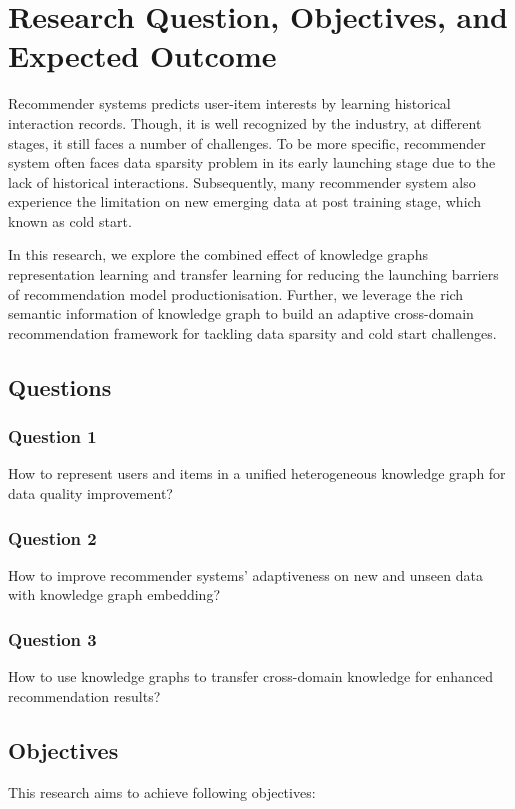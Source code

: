 
\section{Research Question, Objectives, and Expected Outcome}

Recommender systems predicts user-item interests by learning historical interaction records. Though, it is well recognized by the industry, at different stages, it still faces a number of challenges. 
To be more specific, recommender system often faces data sparsity problem in its early launching stage due to the lack of historical interactions. 
Subsequently, many recommender system also experience the limitation on new emerging data at post training stage, which known as cold start. 

In this research, we explore the combined effect of knowledge graphs representation learning and transfer learning for reducing the launching barriers of recommendation model productionisation. Further, we leverage the rich semantic information of knowledge graph to build an adaptive cross-domain recommendation framework for tackling data sparsity and cold start challenges. 

\subsection{Questions}

\subsubsection*{Question 1}
How to represent users and items in a unified heterogeneous knowledge graph for data quality improvement?

\subsubsection*{Question 2}
How to improve recommender systems' adaptiveness on new and unseen data with knowledge graph embedding?

\subsubsection*{Question 3}
How to use knowledge graphs to transfer cross-domain knowledge for enhanced recommendation results?

\subsection{Objectives}
This research aims to achieve following objectives: 

